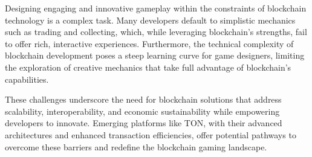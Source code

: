 Designing engaging and innovative gameplay within the constraints of blockchain
technology is a complex task. Many developers default to simplistic mechanics
such as trading and collecting, which, while leveraging blockchain’s strengths,
fail to offer rich, interactive experiences. Furthermore, the technical
complexity of blockchain development poses a steep learning curve for game
designers, limiting the exploration of creative mechanics that take full
advantage of blockchain’s capabilities.

These challenges underscore the need for blockchain solutions that address
scalability, interoperability, and economic sustainability while empowering
developers to innovate. Emerging platforms like TON, with their advanced
architectures and enhanced transaction efficiencies, offer potential pathways to
overcome these barriers and redefine the blockchain gaming landscape.

